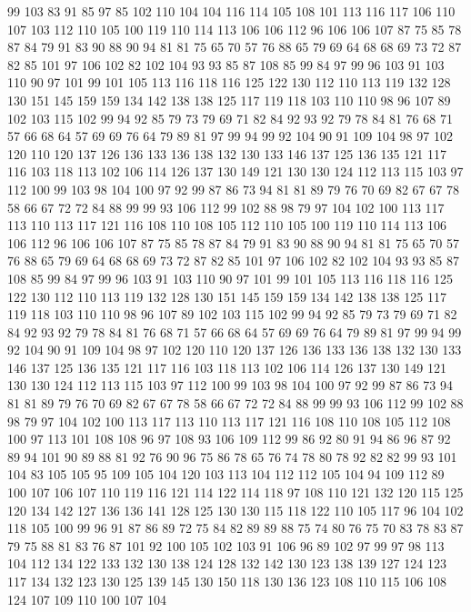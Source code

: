 99 103 83 91 85 97 85 102 110 104 104 116 114 105 108 101 113 116 117 106
110 107 103 112 110 105 100 119 110 114 113 106 106 112 96 106 106 107 87 75
85 78 87 84 79 91 83 90 88 90 94 81 81 75 65 70 57 76 88 65
79 69 64 68 68 69 73 72 87 82 85 101 97 106 102 82 102 104 93 93
85 87 108 85 99 84 97 99 96 103 91 103 110 90 97 101 99 101 105 113
116 118 116 125 122 130 112 110 113 119 132 128 130 151 145 159 159 134 142 138
138 125 117 119 118 103 110 110 98 96 107 89 102 103 115 102 99 94 92 85
79 73 79 69 71 82 84 92 93 92 79 78 84 81 76 68 71 57 66 68
64 57 69 69 76 64 79 89 81 97 99 94 99 92 104 90 91 109 104 98
97 102 120 110 120 137 126 136 133 136 138 132 130 133 146 137 125 136 135 121
117 116 103 118 113 102 106 114 126 137 130 149 121 130 130 124 112 113 115 103
97 112 100 99 103 98 104 100 97 92 99 87 86 73 94 81 81 89 79 76
70 69 82 67 67 78 58 66 67 72 72 84 88 99 99 93 106 112 99 102
88 98 79 97 104 102 100 113 117 113 110 113 117 121 116 108 110 108 105 112
110 105 100 119 110 114 113 106 106 112 96 106 106 107 87 75 85 78 87 84
79 91 83 90 88 90 94 81 81 75 65 70 57 76 88 65 79 69 64 68
68 69 73 72 87 82 85 101 97 106 102 82 102 104 93 93 85 87 108 85
99 84 97 99 96 103 91 103 110 90 97 101 99 101 105 113 116 118 116 125
122 130 112 110 113 119 132 128 130 151 145 159 159 134 142 138 138 125 117 119
118 103 110 110 98 96 107 89 102 103 115 102 99 94 92 85 79 73 79 69
71 82 84 92 93 92 79 78 84 81 76 68 71 57 66 68 64 57 69 69
76 64 79 89 81 97 99 94 99 92 104 90 91 109 104 98 97 102 120 110
120 137 126 136 133 136 138 132 130 133 146 137 125 136 135 121 117 116 103 118
113 102 106 114 126 137 130 149 121 130 130 124 112 113 115 103 97 112 100 99
103 98 104 100 97 92 99 87 86 73 94 81 81 89 79 76 70 69 82 67
67 78 58 66 67 72 72 84 88 99 99 93 106 112 99 102 88 98 79 97
104 102 100 113 117 113 110 113 117 121 116 108 110 108 105 112 108 100 97 113
101 108 108 96 97 108 93 106 109 112 99 86 92 80 91 94 86 96 87 92
89 94 101 90 89 88 81 92 76 90 96 75 86 78 65 76 74 78 80 78
92 82 82 99 93 101 104 83 105 105 95 109 105 104 120 103 113 104 112 112
105 104 94 109 112 89 100 107 106 107 110 119 116 121 114 122 114 118 97 108
110 121 132 120 115 125 120 134 142 127 136 136 141 128 125 130 130 115 118 122
110 105 117 96 104 102 118 105 100 99 96 91 87 86 89 72 75 84 82 89
89 88 75 74 80 76 75 70 83 78 83 87 79 75 88 81 83 76 87 101
92 100 105 102 103 91 106 96 89 102 97 99 97 98 113 104 112 134 122 133
132 130 138 124 128 132 142 130 123 138 139 127 124 123 117 134 132 123 130 125
139 145 130 150 118 130 136 123 108 110 115 106 108 124 107 109 110 100 107 104
